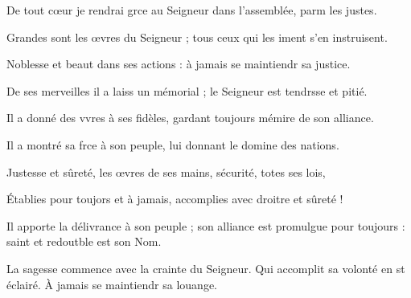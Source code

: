 \item De tout cœur je rendrai grce au Seigneur\psstar{} dans l’assemblée, parm les justes.
\item Grandes sont les œvres du Seigneur ;\psstar{} tous ceux qui les iment s’en instruisent.
\item Noblesse et beaut dans ses actions :\psstar{} à jamais se maintiendr sa justice.
\item De ses merveilles il a laiss un mémorial ;\psstar{} le Seigneur est tendrsse et pitié.
\item Il a donné des vvres à ses fidèles,\psstar{} gardant toujours mémire de son alliance.
\item Il a montré sa frce à son peuple,\psstar{} lui donnant le domine des nations.
\item Justesse et sûreté, les œvres de ses mains,\psstar{} sécurité, totes ses lois,
\item Établies pour toujors et à jamais,\psstar{} accomplies avec droitre et sûreté !
\item Il apporte la délivrance à son peuple ;\pscross{} son alliance est promulgue pour toujours :\psstar{} saint et redoutble est son Nom.
\item La sagesse commence avec la crainte du Seigneur.\pscross{} Qui accomplit sa volonté en st éclairé.\psstar{} À jamais se maintiendr sa louange.